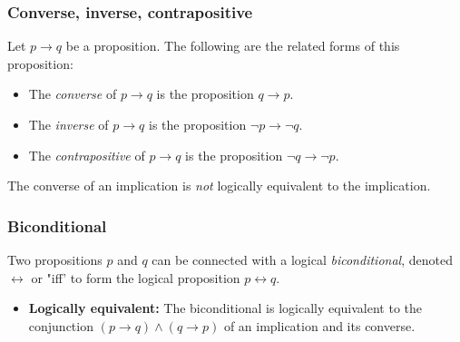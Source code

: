     \subsubsection{Converse, inverse, contrapositive}
    \begin{definition}
        Let \( p \to q \) be a proposition. The following are the related forms of this proposition:

        \begin{itemize}
            \item The \textit{converse} of \( p \to q \) is the proposition \( q \to p \).
            \item The \textit{inverse} of \( p \to q \) is the proposition \( \neg p \to \neg q \).
            \item The \textit{contrapositive} of \( p \to q \) is the proposition \( \neg q \to \neg p \).
        \end{itemize}

    \end{definition}

    \begin{warning}
        The converse of an implication is \emph{not} logically equivalent to the implication.
    \end{warning}

    \subsubsection{Biconditional}
    \begin{definition}
        Two propositions $p$ and $q$ can be connected with a logical \textit{biconditional}, denoted $\leftrightarrow$ or "iff' to form the logical proposition $p \leftrightarrow q$.
        \begin{itemize}
            \item \textbf{Logically equivalent:} The biconditional is logically equivalent to the conjunction $(p \rightarrow q) \land (q \rightarrow p)$ of an implication and its converse. 
        \end{itemize}
    \end{definition}

